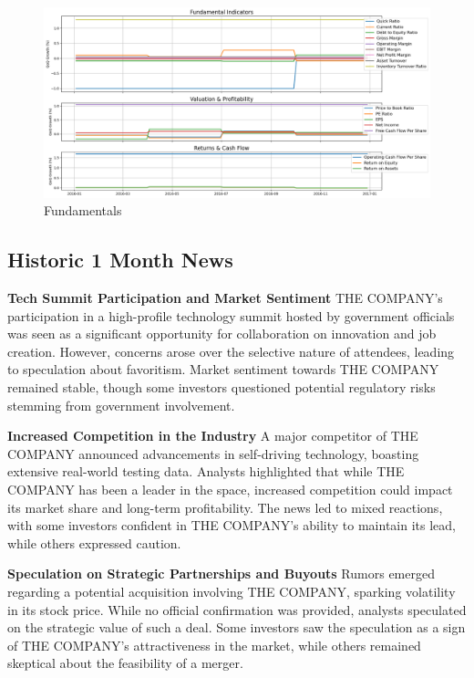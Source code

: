 \documentclass[8pt]{scrartcl}
\begin{document}
\begin{figure}[H]
    \centering
    \includegraphics[width=1\linewidth]{judge_reviews/GOOGL_M_gpt-4o-mini/2017-01-01/judge_Fundamental_Indicators.png}
    \caption{Fundamentals}
\end{figure}

\subsection*{Historic 1 Month News}

\textbf{Tech Summit Participation and Market Sentiment}
THE COMPANY's participation in a high-profile technology summit hosted by government officials was seen as a significant opportunity for collaboration on innovation and job creation. However, concerns arose over the selective nature of attendees, leading to speculation about favoritism. Market sentiment towards THE COMPANY remained stable, though some investors questioned potential regulatory risks stemming from government involvement.

\textbf{Increased Competition in the Industry}
A major competitor of THE COMPANY announced advancements in self-driving technology, boasting extensive real-world testing data. Analysts highlighted that while THE COMPANY has been a leader in the space, increased competition could impact its market share and long-term profitability. The news led to mixed reactions, with some investors confident in THE COMPANY’s ability to maintain its lead, while others expressed caution.

\textbf{Speculation on Strategic Partnerships and Buyouts}
Rumors emerged regarding a potential acquisition involving THE COMPANY, sparking volatility in its stock price. While no official confirmation was provided, analysts speculated on the strategic value of such a deal. Some investors saw the speculation as a sign of THE COMPANY's attractiveness in the market, while others remained skeptical about the feasibility of a merger.
\end{document}
